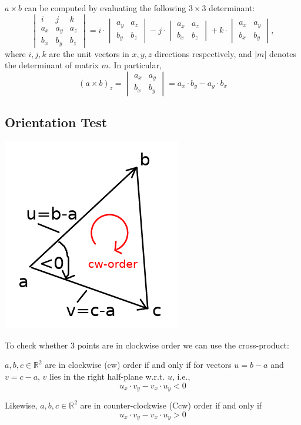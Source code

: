\documentclass[a4paper,11pt]{article}
\begin{document}
$a \times b$ can be computed by evaluating the following $3 \times 3$ determinant:
\[ 
\begin{vmatrix}
    i & j & k \\
    a_x & a_y & a_z \\
    b_x & b_y & b_z
\end{vmatrix}  
= 
i \cdot 
\begin{vmatrix}
    a_y & a_z \\
    b_y & b_z
\end{vmatrix}
- j \cdot 
\begin{vmatrix}
    a_x & a_z \\
    b_x & b_z
\end{vmatrix}
+ k \cdot 
\begin{vmatrix}
    a_x & a_y \\
    b_x & b_y
\end{vmatrix},
\]
where $i, j, k$ are the unit vectors in $x, y, z$ directions respectively,
and $|m|$ denotes the determinant of matrix $m$. In particular,
\[
(a \times b)_z = 
\begin{vmatrix}
    a_x & a_y \\
    b_x & b_y
\end{vmatrix}
= a_x \cdot b_y - a_y \cdot b_x 
\]


\subsection*{Orientation Test}
\centerline{\includegraphics[width=0.3\linewidth]{orientation.png}}

To check whether 3 points are in clockwise order we can use the cross-product:

\medskip 

$a, b, c \in \mathbb{R}^2$ are in clockwise (cw) order if and only if for vectors
$u = b-a$ and $v = c-a$, $v$ lies in the right half-plane w.r.t. $u$,
i.e.,
\[ u_x \cdot v_y - v_x \cdot u_y < 0 \]

Likewise, $a, b, c \in \mathbb{R}^2$ are in counter-clockwise (Ccw) order if and only if
\[ u_x \cdot v_y - v_x \cdot u_y > 0 \]
\end{document}
